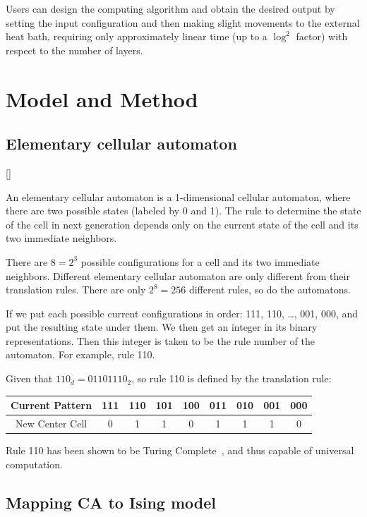 \documentclass[twocolumn,superscriptaddress,english,showpacs,longbibliography]{revtex4-2}
\newcommand{\ym}[1]{[{\color{red}{YM: #1}}]}
\begin{document}
Users can design the computing algorithm and obtain the desired output by setting the input configuration and then making slight movements to the external heat bath, requiring only approximately linear time (up to a $\log^2$ factor) with respect to the number of layers.

\section{Model and Method}




\subsection{Elementary cellular automaton}\label{elementary-cellular-automaton}
\ym{I haven't made change in this section}

An elementary cellular automaton is a 1-dimensional cellular
automaton, where there are two possible states (labeled by 0 and 1). The rule to
determine the state of the cell in next generation depends only on the
current state of the cell and its two immediate neighbors.

There are $8 = 2^3$ possible configurations for a cell and its two
immediate neighbors. Different elementary cellular automaton are only
different from their translation rules. There are only $2^8 = 256$
different rules, so do the automatons.

If we put each possible current configurations in order: 111, 110,
\ldots, 001, 000, and put the resulting state under them. We then get an
integer in its binary representations. Then this integer is taken to be
the rule number of the automaton. For example, rule 110.

Given that $110_d = 01101110_2$, so rule 110 is defined by the
translation rule:

\begin{tabular}{|c|c|c|c|c|c|c|c|c|}
\hline
Current Pattern & 111 & 110 & 101 & 100 & 011 & 010 & 001 & 000 \\
\hline
New Center Cell & 0 & 1 & 1 & 0 & 1 & 1 & 1 & 0 \\
\hline
\end{tabular}

Rule 110 has been shown to be Turing Complete~\cite{Cook2009}, and thus capable of universal
computation.

\subsection{Mapping CA to Ising model}
\end{document}
